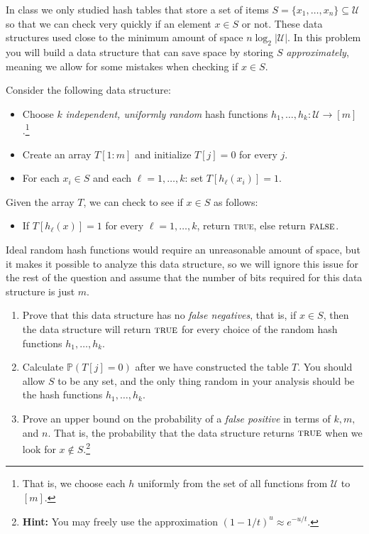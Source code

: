 \documentclass[11pt]{article}
\theoremstyle{definition}
\begin{document}
\begin{enumerate}[leftmargin=0pt, itemsep=3ex]
\problemitem In class we only studied hash tables that store a set of items $S = \{x_1,\dots,x_n\} \subseteq \mathcal{U}$ so that we can check very quickly if an element $x \in S$ or not.  These data structures used close to the minimum amount of space $n \log_2 |\mathcal{U}|$.  In this problem you will build a data structure that can save space by storing $S$ \emph{approximately}, meaning we allow for some mistakes when checking if $x \in S$.

Consider the following data structure:
\begin{itemize}[nosep]
    \item Choose $k$ \emph{independent, uniformly random} hash functions $h_1,\dots,h_k : \mathcal{U} \to [m]$.\footnote{That is, we choose each $h$ uniformly from the set of all functions from $\mathcal{U}$ to $[m]$.}
    \item Create an array $T[1:m]$ and initialize $T[j] = 0$ for every $j$.
    \item For each $x_i \in S$ and each $\ell = 1,\dots,k$: set $T[h_\ell(x_i)] = 1$.
\end{itemize}
Given the array $T$, we can check to see if $x \in S$ as follows:
\begin{itemize}[nosep]
    \item If $T[h_{\ell}(x)] = 1$ for every $\ell = 1,\dots,k$, return \textsc{true}, else return $\textsc{false}$.
\end{itemize}
Ideal random hash functions would require an unreasonable amount of space, but it makes it possible to analyze this data structure, so we will ignore this issue for the rest of the question and assume that the number of bits required for this data structure is just $m$.
\begin{enumerate}[leftmargin=\parindent, itemsep=1ex]
    \item Prove that this data structure has no \emph{false negatives}, that is, if $x \in S$, then the data structure will return $\textsc{true}$ for every choice of the random hash functions $h_1,\dots,h_k$.
    
    \item Calculate $\mathbb{P}(T[j] = 0)$ after we have constructed the table $T$.  You should allow $S$ to be any set, and the only thing random in your analysis should be the hash functions $h_1,\dots,h_k$.
    
    \item Prove an upper bound on the probability of a \emph{false positive} in terms of $k, m,$ and  $n$.  That is, the probability that the data structure returns $\textsc{true}$ when we look for $x \not\in S$.\footnote{\textbf{Hint:} You may freely use the approximation $(1-1/t)^u \approx e^{-u/t}$.}
    

\end{enumerate}
\end{enumerate}
\end{document}
